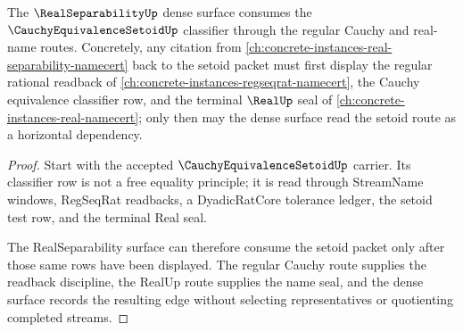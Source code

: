 \begin{theorem}
\label{thm:cauchy-equivalence-setoid-real-separability-backlink}
The $\RealSeparabilityUp$ dense surface consumes the $\CauchyEquivalenceSetoidUp$ classifier through the regular Cauchy and real-name routes. Concretely, any citation from \autoref{ch:concrete-instances-real-separability-namecert} back to the setoid packet must first display the regular rational readback of \autoref{ch:concrete-instances-regseqrat-namecert}, the Cauchy equivalence classifier row, and the terminal $\RealUp$ seal of \autoref{ch:concrete-instances-real-namecert}; only then may the dense surface read the setoid route as a horizontal dependency.
\end{theorem}
\begin{proof}
Start with the accepted $\CauchyEquivalenceSetoidUp$ carrier. Its classifier row is not a free equality principle; it is read through StreamName windows, RegSeqRat readbacks, a DyadicRatCore tolerance ledger, the setoid test row, and the terminal Real seal.

The RealSeparability surface can therefore consume the setoid packet only after those same rows have been displayed. The regular Cauchy route supplies the readback discipline, the RealUp route supplies the name seal, and the dense surface records the resulting edge without selecting representatives or quotienting completed streams.
\end{proof}
